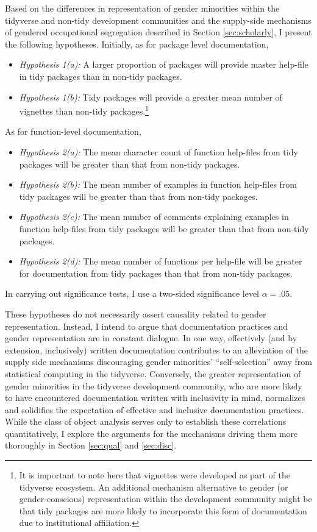 Based on the differences in representation of gender minorities within the tidyverse and non-tidy development communities and the supply-side mechanisms of gendered occupational segregation described in Section \ref{sec:scholarly}, I present the following hypotheses. Initially, as for package level documentation,

\begin{itemize}
	\item \textit{Hypothesis 1(a):} A larger proportion of packages will provide master help-file in tidy packages than in non-tidy packages.
	\item \textit{Hypothesis 1(b):} Tidy packages will provide a greater mean number of vignettes than non-tidy packages.\footnote{It is important to note here that vignettes were developed as part of the tidyverse ecosystem. An additional mechanism alternative to gender (or gender-conscious) representation within the development community might be that tidy packages are more likely to incorporate this form of documentation due to institutional affiliation.}
\end{itemize}

As for function-level documentation,

\begin{itemize}
	\item \textit{Hypothesis 2(a):} The mean character count of function help-files from tidy packages will be greater than that from non-tidy packages.
	\item \textit{Hypothesis 2(b):} The mean number of examples in function help-files from tidy packages will be greater than that from non-tidy packages.
	\item \textit{Hypothesis 2(c):} The mean number of comments explaining examples in function help-files from tidy packages will be greater than that from non-tidy packages.
	\item \textit{Hypothesis 2(d):} The mean number of functions per help-file will be greater for documentation from tidy packages than that from non-tidy packages.
\end{itemize}

In carrying out significance tests, I use a two-sided significance level $\alpha = .05$.

These hypotheses do not necessarily assert causality related to gender representation. Instead, I intend to argue that documentation practices and gender representation are in constant dialogue. In one way, effectively (and by extension, inclusively) written documentation contributes to an alleviation of the supply side mechanisms discouraging gender minorities' ``self-selection'' away from statistical computing in the tidyverse. Conversely, the greater representation of gender minorities in the tidyverse development community, who are more likely to have encountered documentation written with inclusivity in mind, normalizes and solidifies the expectation of effective and inclusive documentation practices. While the class of object analysis serves only to establish these correlations quantitatively, I explore the arguments for the mechanisms driving them more thoroughly in Section \ref{sec:qual} and \ref{sec:disc}.

